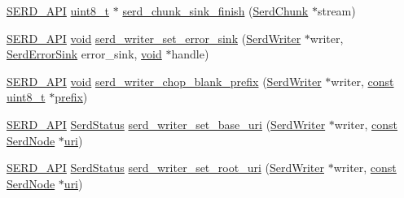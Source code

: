 \begin{DoxyCompactItemize}
\item 
\hyperlink{serd_8h_a17b2ce3a34831e5e95018430d798bd66}{S\+E\+R\+D\+\_\+\+A\+PI} \hyperlink{lib-src_2ffmpeg_2win32_2stdint_8h_a9a941819355e6f658991890ff66b4b0e}{uint8\+\_\+t} $\ast$ \hyperlink{group__serd_gad91b770366f31f3ae83dcdde8c1d6c5d}{serd\+\_\+chunk\+\_\+sink\+\_\+finish} (\hyperlink{struct_serd_chunk}{Serd\+Chunk} $\ast$stream)
\item 
\hyperlink{serd_8h_a17b2ce3a34831e5e95018430d798bd66}{S\+E\+R\+D\+\_\+\+A\+PI} \hyperlink{sound_8c_ae35f5844602719cf66324f4de2a658b3}{void} \hyperlink{group__serd_gae5b20ff80e98f8b945bf268f7dd1b1aa}{serd\+\_\+writer\+\_\+set\+\_\+error\+\_\+sink} (\hyperlink{group__serd_gaaaa09490e19dff0180251f1e2524e6f0}{Serd\+Writer} $\ast$writer, \hyperlink{group__serd_ga925d2fda236697a3e643b307ffe242e5}{Serd\+Error\+Sink} error\+\_\+sink, \hyperlink{sound_8c_ae35f5844602719cf66324f4de2a658b3}{void} $\ast$handle)
\item 
\hyperlink{serd_8h_a17b2ce3a34831e5e95018430d798bd66}{S\+E\+R\+D\+\_\+\+A\+PI} \hyperlink{sound_8c_ae35f5844602719cf66324f4de2a658b3}{void} \hyperlink{group__serd_gaa924d2dcd23afb02ade707be75c7771b}{serd\+\_\+writer\+\_\+chop\+\_\+blank\+\_\+prefix} (\hyperlink{group__serd_gaaaa09490e19dff0180251f1e2524e6f0}{Serd\+Writer} $\ast$writer, \hyperlink{getopt1_8c_a2c212835823e3c54a8ab6d95c652660e}{const} \hyperlink{lib-src_2ffmpeg_2win32_2stdint_8h_a9a941819355e6f658991890ff66b4b0e}{uint8\+\_\+t} $\ast$\hyperlink{structprefix}{prefix})
\item 
\hyperlink{serd_8h_a17b2ce3a34831e5e95018430d798bd66}{S\+E\+R\+D\+\_\+\+A\+PI} \hyperlink{group__serd_ga104d544e48b6282ef2447bb3ac7c330d}{Serd\+Status} \hyperlink{group__serd_ga4149ade7ac611ba531af6d47d821ae3e}{serd\+\_\+writer\+\_\+set\+\_\+base\+\_\+uri} (\hyperlink{group__serd_gaaaa09490e19dff0180251f1e2524e6f0}{Serd\+Writer} $\ast$writer, \hyperlink{getopt1_8c_a2c212835823e3c54a8ab6d95c652660e}{const} \hyperlink{struct_serd_node}{Serd\+Node} $\ast$\hyperlink{lib_2expat_8h_a5a9fdd6c2606370ad12f24c078ac6585}{uri})
\item 
\hyperlink{serd_8h_a17b2ce3a34831e5e95018430d798bd66}{S\+E\+R\+D\+\_\+\+A\+PI} \hyperlink{group__serd_ga104d544e48b6282ef2447bb3ac7c330d}{Serd\+Status} \hyperlink{group__serd_gaf15a4cba59efb5ed1a19fabc0c825825}{serd\+\_\+writer\+\_\+set\+\_\+root\+\_\+uri} (\hyperlink{group__serd_gaaaa09490e19dff0180251f1e2524e6f0}{Serd\+Writer} $\ast$writer, \hyperlink{getopt1_8c_a2c212835823e3c54a8ab6d95c652660e}{const} \hyperlink{struct_serd_node}{Serd\+Node} $\ast$\hyperlink{lib_2expat_8h_a5a9fdd6c2606370ad12f24c078ac6585}{uri})

\end{DoxyCompactItemize}
